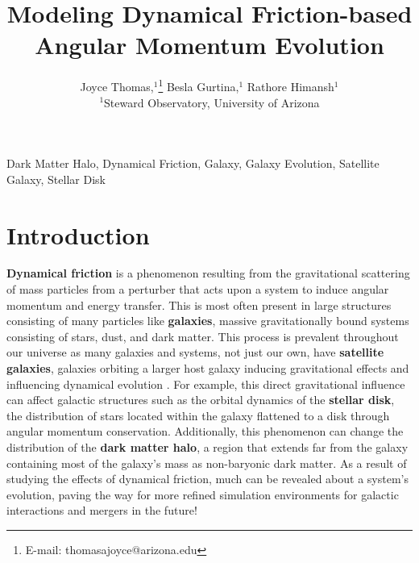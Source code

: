 \documentclass[fleqn,usenatbib]{mnras}
\title[Angular Momentum Evolution of M33 and M31]{Modeling Dynamical Friction-based Angular Momentum Evolution}
\author[Joyce]{
Joyce Thomas,$^{1}$\thanks{E-mail: thomasajoyce@arizona.edu}
Besla Gurtina,$^{1}$
Rathore Himansh$^{1}$
\\
$^{1}$Steward Observatory, University of Arizona
}
\begin{document}
\label{firstpage}
\pagerange{\pageref{firstpage}--\pageref{lastpage}}
\maketitle



\begin{keywords}
Dark Matter Halo, Dynamical Friction, Galaxy, Galaxy Evolution, Satellite Galaxy, Stellar Disk
\end{keywords}



\section{Introduction}  %

\hspace{\parindent} \textbf{Dynamical friction} is a phenomenon resulting from the gravitational scattering of mass particles from a perturber that acts upon a system to induce angular momentum and energy transfer. This is most often present in large structures consisting of many particles like \textbf{galaxies}, massive gravitationally bound systems consisting of stars, dust, and dark matter. This process is prevalent throughout our universe as many galaxies and systems, not just our own, have \textbf{satellite galaxies}, galaxies orbiting a larger host galaxy inducing gravitational effects and influencing dynamical evolution \citep{Binney_Tremaine-2008}. For example, this direct gravitational influence can affect galactic structures such as the orbital dynamics of the \textbf{stellar disk}, the distribution of stars located within the galaxy flattened to a disk through angular momentum conservation. Additionally, this phenomenon can change the distribution of the \textbf{dark matter halo}, a region that extends far from the galaxy containing most of the galaxy's mass as non-baryonic dark matter. As a result of studying the effects of dynamical friction, much can be revealed about a system's evolution, paving the way for more refined simulation environments for galactic interactions and mergers in the future!

\vspace{10pt}
\end{document}
